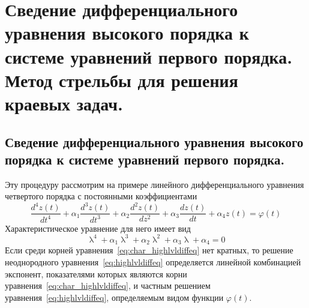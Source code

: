 \section{Сведение дифференциального уравнения высокого порядка к системе уравнений первого порядка. Метод стрельбы для решения краевых задач.}\label{sec:ch29}

\subsection{Сведение дифференциального уравнения высокого порядка к системе уравнений первого порядка.}
Эту процедуру рассмотрим на примере линейного дифференциального уравнения четвертого порядка с постоянными
коэффициентами
\begin{equation}
    \frac{d^4 z(t)}{dt^4} + \alpha_1\frac{d^3 z(t)}{dt^3} + \alpha_2\frac{d^2 z(t)}{dz^2} + \alpha_3\frac{dz(t)}{dt} + \alpha_4 z(t) = \varphi(t)
    \label{eq:highlvldiffeq}
\end{equation}
Характеристическое уравнение для него имеет вид
\begin{equation}
    \uplambda^4 + \alpha_1 \uplambda^3 + \alpha_2 \uplambda^2 + \alpha_3 \uplambda + \alpha_4 = 0
    \label{eq:char_highlvldiffeq}
\end{equation}
Если среди корней уравнения~\eqref{eq:char_highlvldiffeq} нет кратных, то решение неоднородного уравнения~\eqref{eq:highlvldiffeq}
определяется линейной комбинацией экспонент, показателями которых являются корни уравнения~\eqref{eq:char_highlvldiffeq},
и частным решением уравнения~\eqref{eq:highlvldiffeq}, определяемым видом функции $\varphi(t)$.


